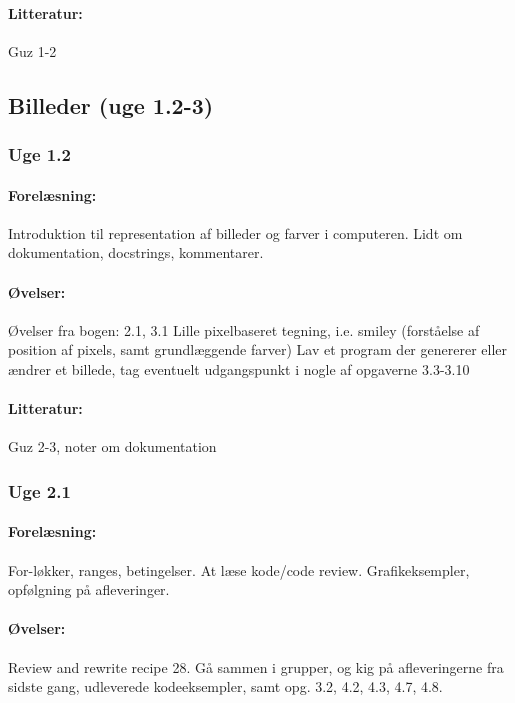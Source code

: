 \documentclass[12pt]{article}
\begin{document}
\paragraph{Litteratur:} Guz 1-2


\subsection{Billeder (uge 1.2-3) }


\subsubsection{Uge 1.2}
\paragraph{Forelæsning:} 
Introduktion til representation af billeder og farver i computeren. Lidt om dokumentation, docstrings, kommentarer.

\paragraph{Øvelser:}
Øvelser fra bogen: 2.1, 3.1
Lille pixelbaseret tegning, i.e. smiley (forståelse af position af pixels, samt grundlæggende farver) 
Lav et program der genererer eller ændrer et billede, tag eventuelt udgangspunkt i nogle af opgaverne 3.3-3.10

\paragraph{Litteratur:} Guz 2-3, noter om dokumentation

\subsubsection{Uge 2.1}
\paragraph{Forelæsning:} 
For-løkker, ranges, betingelser.
At læse kode/code review. 
Grafikeksempler, opfølgning på afleveringer.

\paragraph{Øvelser:} 
Review and rewrite recipe 28.
Gå sammen i grupper, og kig på afleveringerne fra sidste gang, udleverede kodeeksempler, samt opg. 3.2, 4.2, 4.3, 4.7, 4.8.
\end{document}
